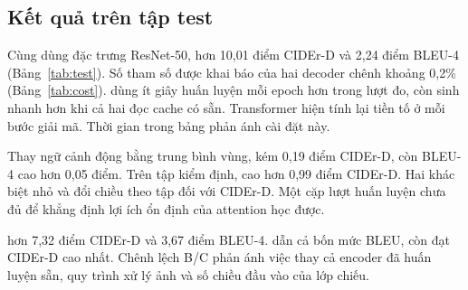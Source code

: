 \subsection{Kết quả trên tập test}

Cùng dùng đặc trưng ResNet-50, \modelA{} hơn \modelB{} 10,01 điểm CIDEr-D và 2,24 điểm BLEU-4 (Bảng~\ref{tab:test}). Số tham số được khai báo của hai decoder chênh khoảng 0,2\% (Bảng~\ref{tab:cost}). \modelB{} dùng ít giây huấn luyện mỗi epoch hơn trong lượt đo, còn \modelA{} sinh nhanh hơn khi cả hai đọc cache có sẵn. Transformer hiện tính lại tiền tố ở mỗi bước giải mã. Thời gian trong bảng phản ánh cài đặt này.

Thay ngữ cảnh động bằng trung bình vùng, \modelAz{} kém \modelA{} 0,19 điểm CIDEr-D, còn BLEU-4 cao hơn 0,05 điểm. Trên tập kiểm định, \modelAz{} cao hơn \modelA{} 0,99 điểm CIDEr-D. Hai khác biệt nhỏ và đổi chiều theo tập đối với CIDEr-D. Một cặp lượt huấn luyện chưa đủ để khẳng định lợi ích ổn định của attention học được.

\modelC{} hơn \modelB{} 7,32 điểm CIDEr-D và 3,67 điểm BLEU-4. \modelC{} dẫn cả bốn mức BLEU, còn \modelA{} đạt CIDEr-D cao nhất. Chênh lệch B/C phản ánh việc thay cả encoder đã huấn luyện sẵn, quy trình xử lý ảnh và số chiều đầu vào của lớp chiếu.
